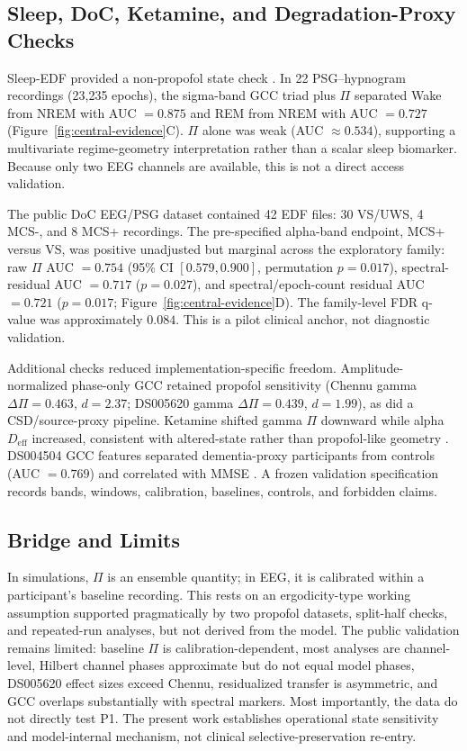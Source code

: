 \documentclass[11pt,a4paper]{article}
\theoremstyle{plain}
\theoremstyle{definition}
\theoremstyle{remark}
\newcommand{\Deff}{D_{\mathrm{eff}}}
\begin{document}
\subsection{Sleep, DoC, Ketamine, and Degradation-Proxy Checks}
\label{sec:sleep-edf}
\label{sec:doc-anchor}
\label{sec:additional-controls}

Sleep-EDF provided a non-propofol state check \citep{kemp2000}. In 22 PSG--hypnogram recordings (23,235 epochs), the sigma-band GCC triad plus $\Pi$ separated Wake from NREM with AUC $=0.875$ and REM from NREM with AUC $=0.727$ (Figure~\ref{fig:central-evidence}C). $\Pi$ alone was weak (AUC $\approx0.534$), supporting a multivariate regime-geometry interpretation rather than a scalar sleep biomarker. Because only two EEG channels are available, this is not a direct access validation.

The public DoC EEG/PSG dataset contained 42 EDF files: 30 VS/UWS, 4 MCS-, and 8 MCS+ recordings. The pre-specified alpha-band endpoint, MCS+ versus VS, was positive unadjusted but marginal across the exploratory family: raw $\Pi$ AUC $=0.754$ (95\% CI $[0.579,0.900]$, permutation $p=0.017$), spectral-residual AUC $=0.717$ ($p=0.027$), and spectral/epoch-count residual AUC $=0.721$ ($p=0.017$; Figure~\ref{fig:central-evidence}D). The family-level FDR q-value was approximately $0.084$. This is a pilot clinical anchor, not diagnostic validation.

Additional checks reduced implementation-specific freedom. Amplitude-normalized phase-only GCC retained propofol sensitivity (Chennu gamma $\Delta\Pi=0.463$, $d=2.37$; DS005620 gamma $\Delta\Pi=0.439$, $d=1.99$), as did a CSD/source-proxy pipeline. Ketamine shifted gamma $\Pi$ downward while alpha $\Deff$ increased, consistent with altered-state rather than propofol-like geometry \citep{farnes2020}. DS004504 GCC features separated dementia-proxy participants from controls (AUC $=0.769$) and correlated with MMSE \citep{miltiadous2023ds004504}. A frozen validation specification records bands, windows, calibration, baselines, controls, and forbidden claims.

\subsection{Bridge and Limits}
\label{sec:pilot-bridge}
\label{sec:pilot-limits}

In simulations, $\Pi$ is an ensemble quantity; in EEG, it is calibrated within a participant's baseline recording. This rests on an ergodicity-type working assumption supported pragmatically by two propofol datasets, split-half checks, and repeated-run analyses, but not derived from the model. The public validation remains limited: baseline $\Pi$ is calibration-dependent, most analyses are channel-level, Hilbert channel phases approximate but do not equal model phases, DS005620 effect sizes exceed Chennu, residualized transfer is asymmetric, and GCC overlaps substantially with spectral markers. Most importantly, the data do not directly test P1. The present work establishes operational state sensitivity and model-internal mechanism, not clinical selective-preservation re-entry.
\end{document}
